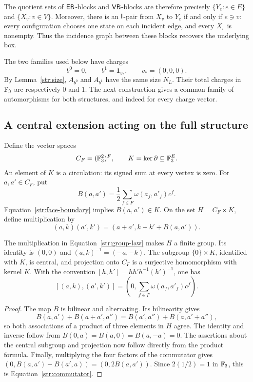 The quotient sets of $\mathsf{EB}$-blocks and $\mathsf{VB}$-blocks are therefore precisely
$\{Y_e:e\in E\}$ and $\{X_v:v\in V\}$.  Moreover, there is an $\mathsf I$-pair
from $X_v$ to $Y_e$ if and only if $e\ni v$: every configuration chooses
one state on each incident edge, and every $X_v$ is nonempty.  Thus the
incidence graph between these blocks recovers the underlying box.

The two families used below have charges
\begin{equation}\label{str:charges}
 b^0=0,\qquad b^1=\mathbf1_{v_*},\qquad v_*=(0,0,0).
\end{equation}
By Lemma~\ref{str:size}, $A_{b^0}$ and $A_{b^1}$ have the same size $N_L$.
Their total charges in $\mathbb F_3$ are respectively $0$ and $1$.  The next
construction gives a common family of automorphisms for both structures,
and indeed for every charge vector.

\subsection{A central extension acting on the full structure}

Define the vector spaces
\[
 C_F=(\mathbb F_3^2)^F,\qquad K=\ker\partial\subseteq\mathbb F_3^E.
\]
An element of $K$ is a circulation: its signed sum at every vertex is
zero.  For $a,a'\in C_F$, put
\[
 B(a,a')=\frac12\sum_{f\in F}\omega(a_f,a'_f)c^f.
\]
Equation~\eqref{str:face-boundary} implies $B(a,a')\in K$.
On the set $H=C_F\times K$, define multiplication by
\begin{equation}\label{str:group-law}
 (a,k)(a',k')=(a+a',k+k'+B(a,a')).
\end{equation}

\begin{lemma}\label{str:central-extension}
The multiplication in Equation~\eqref{str:group-law} makes $H$ a finite
group.  Its identity is $(0,0)$ and $(a,k)^{-1}=(-a,-k)$.
The subgroup $\{0\}\times K$, identified with $K$, is central, and
projection onto $C_F$ is a surjective homomorphism with kernel $K$.
With the convention $[h,h']=hh'h^{-1}(h')^{-1}$, one has
\begin{equation}\label{str:commutator}
 [(a,k),(a',k')]
 =\left(0,\sum_{f\in F}\omega(a_f,a'_f)c^f\right).
\end{equation}
\end{lemma}
\begin{proof}
The map $B$ is bilinear and alternating.  Its bilinearity gives
\[
 B(a,a')+B(a+a',a'')=B(a',a'')+B(a,a'+a''),
\]
so both associations of a product of three elements in $H$ agree.
The identity and inverse follow from $B(0,a)=B(a,0)=B(a,-a)=0$.
The assertions about the central subgroup and projection now follow
directly from the product formula.  Finally, multiplying the four factors
of the commutator gives $(0,B(a,a')-B(a',a))=(0,2B(a,a'))$.
Since $2(1/2)=1$ in $\mathbb F_3$, this is Equation~\eqref{str:commutator}.
\end{proof}

